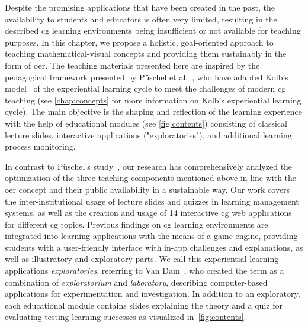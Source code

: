 Despite the promising applications that have been created in the past, the availability to students and educators is often very limited, resulting in the described \acrshort{cg} learning environments being insufficient or not available for teaching purposes. In this chapter, we propose a holistic, goal-oriented approach to teaching mathematical-visual concepts and providing them sustainably in the form of \acrshort{oer}. The teaching materials presented here are inspired by the pedagogical framework presented by Püschel et al.~\cite{pueschel:2013:MRCG}, who have adapted Kolb's model~\cite{kolb:1984:experiential} of the experiential learning cycle to meet the challenges of modern \acrshort{cg} teaching (see \autoref{chap:concepts} for more information on Kolb's experiential learning cycle). The main objective is the shaping and reflection of the learning experience with the help of educational modules (see \autoref{fig:contents}) consisting of classical lecture slides, interactive applications ("exploratories"), and additional learning process monitoring.

In contrast to Püschel's study~\cite{pueschel:2013:MRCG}, our research has comprehensively analyzed the optimization of the three teaching components mentioned above in line with the \acrshort{oer} concept and their public availability in a sustainable way. Our work covers the inter-institutional usage of lecture slides and quizzes in learning management systems, as well as the creation and usage of 14 interactive \acrshort{cg} web applications for different \acrshort{cg} topics. Previous findings on \acrshort{cg} learning environments are integrated into learning applications with the means of a game engine, providing students with a user-friendly interface with in-app challenges and explanations, as well as illustratory and exploratory parts. We call this experiential learning applications \emph{exploratories}, referring to Van Dam~\cite{vanDam:1999:education}, who created the term as a combination of \emph{exploratorium} and \emph{laboratory}, describing computer-based applications for experimentation and investigation. In addition to an exploratory, each educational module contains slides explaining the theory and a quiz for evaluating testing learning successes as visualized in~\autoref{fig:contents}.

